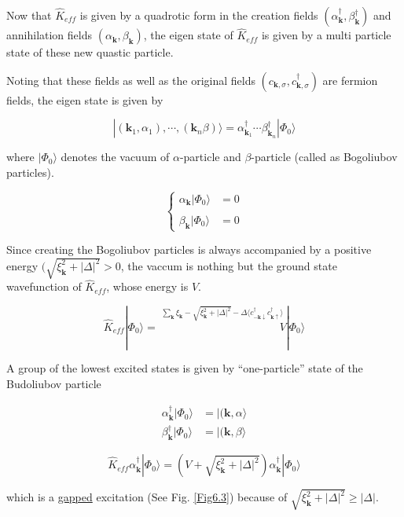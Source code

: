 ﻿\documentclass[twoside]{book}
\numberwithin{equation}{section}
\begin{document}
Now that $\hat{K}_{eff}$ is given by a quadrotic form in the creation fields $(\alpha_{\bm{k}}^\dagger, \beta_{\bm{k}}^\dagger)$ and annihilation fields $(\alpha_{\bm{k}}, \beta_{\bm{k}})$, the eigen state of $\hat{K}_{eff}$ is given by a multi particle state of these new quastic particle. 

Noting that these fields as well as the original fields $(c_{\bm{k},\sigma}, c_{\bm{k},\sigma}^\dagger)$ are fermion fields, the eigen state is given by 

\[|(\bm{k}_1,\alpha_1),\cdots,(\bm{k}_n\beta)\rangle = \alpha_{\bm{k}_1}^\dagger \cdots \beta_{\bm{k}_n}^\dagger|\Phi_0\rangle \]

where $|\Phi_0\rangle$ denotes the vacuum of $\alpha$-particle and $\beta$-particle (called as Bogoliubov particles). 

\[\begin{cases}
\alpha_{\bm{k}}|\Phi_0\rangle &= 0\\
\ & \ \\
\beta_{\bm{k}}|\Phi_0\rangle &= 0
\end{cases}\]

Since creating the Bogoliubov particles is always accompanied by a positive energy $(\sqrt{\xi_{\bm{k}}^2+|\Delta|^2}>0$, the vaccum is nothing but the ground state wavefunction of $\hat{K}_{eff}$, whose energy is $V$. 

\[\hat{K}_{eff}|\Phi_0\rangle = \overset{\sum_{\bm{k}}\xi_{\bm{k}}-\sqrt{\xi_{\bm{k}}^2+|\Delta|^2}-\Delta\langle c_{-\bm{k}\downarrow}^\dagger c_{\bm{k}\uparrow}^\dagger\rangle}{\quad\quad\quad\quad\quad\quad\quad\quad\quad\quad\quad V}|\Phi_0\rangle \]

A group of the lowest excited states is given by ``one-particle'' state of the Budoliubov particle

\[\begin{split}
\alpha_{\bm{k}}^\dagger|\Phi_0\rangle &= |(\bm{k},\alpha\rangle\\
\beta_{\bm{k}}^\dagger|\Phi_0\rangle &= |(\bm{k}, \beta\rangle
\end{split}\]

\[\hat{K}_{eff} \alpha_{\bm{k}}^\dagger|\Phi_0\rangle = (V+\sqrt{\xi_{\bm{k}}^2+|\Delta|^2})\alpha_{\bm{k}}^\dagger|\Phi_0\rangle \]

which is a \uline{gapped} excitation (See Fig. \ref{Fig6.3}) because of $\sqrt{\xi_{\bm{k}}^2+|\Delta|^2}\ge|\Delta|$. 
\end{document}
